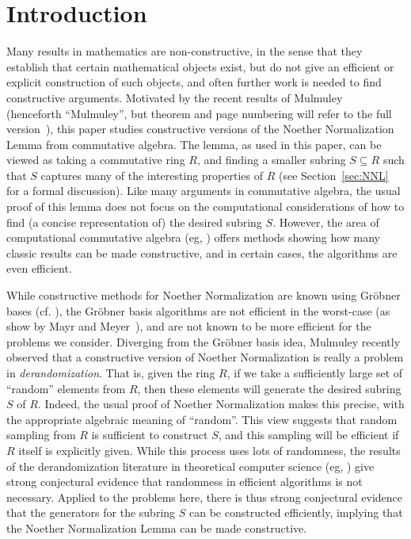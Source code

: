 \documentclass[letterpaper,11pt]{article}
\numberwithin{equation}{section}
\theoremstyle{plain}
\theoremstyle{remark}
\begin{document}









\section{Introduction}

Many results in mathematics are non-constructive, in the sense that they establish that certain mathematical objects exist, but do not give an efficient or explicit construction of such objects, and often further work is needed to find constructive arguments.  Motivated by the recent results of Mulmuley~\cite{Mulmuley12} (henceforth ``Mulmuley'', but theorem and page numbering will refer to the full version~\cite{Mulmuley12full}), this paper studies constructive versions of the Noether Normalization Lemma from commutative algebra.  The lemma, as used in this paper, can be viewed as taking a commutative ring $R$, and finding a smaller subring $S\subseteq R$ such that $S$ captures many of the interesting properties of $R$ (see Section~\ref{sec:NNL} for a formal discussion).  Like many arguments in commutative algebra, the usual proof of this lemma does not focus on the computational considerations of how to find (a concise representation of) the desired subring $S$.  However, the area of computational commutative algebra (eg, \cite{DK,CLO}) offers methods showing how many classic results can be made constructive, and in certain cases, the algorithms are even efficient.

While constructive methods for Noether Normalization are known using Gr\"{o}bner bases (cf. \cite{CLO}), the Gr\"{o}bner basis algorithms are not efficient in the worst-case (as show by Mayr and Meyer~\cite{MayrMeyer}), and are not known to be more efficient for the problems we consider.  Diverging from the Gr\"{o}bner basis idea, Mulmuley recently observed that a constructive version of Noether Normalization is really a problem in \textit{derandomization}.  That is, given the ring $R$, if we take a sufficiently large set of ``random'' elements from $R$, then these elements will generate the desired subring $S$ of $R$.  Indeed, the usual proof of Noether Normalization makes this precise, with the appropriate algebraic meaning of ``random''. This view suggests that random sampling from $R$ is sufficient to construct $S$, and this sampling will be efficient if $R$ itself is explicitly given. While this process uses lots of randomness, the results of the derandomization literature in theoretical computer science (eg, \cite{IW97,IKW02,KabanetsImpagliazzo04}) give strong conjectural evidence that randomness in efficient algorithms is not necessary.  Applied to the problems here, there is thus strong conjectural evidence that the generators for the subring $S$ can be constructed efficiently, implying that the Noether Normalization Lemma can be made constructive.
\end{document}
